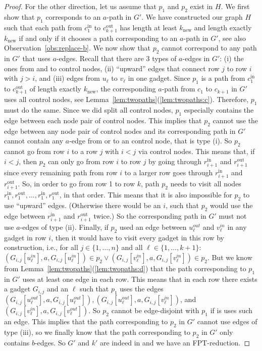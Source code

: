 \documentclass[a4paper,english]{lipics-v2016}
\theoremstyle{plain}
\begin{document}
\begin{proof}
For the other direction, let us assume that $p_1$ and $p_2$ exist in $H$.
We first show that $p_1$ corresponds to an $a$-path in $G'$. 
We have constructed our graph $H$ such that each path from $c_{1}^\text{in}$ to $c_{k+1}^\text{out}$ has length at least $k_\text{new}$ and length exactly $k_\text{new}$ if and only if it chooses a path corresponding to an $a$-path in $G'$, see also Observation~\ref{obs:replace-b}. 
We now show that $p_2$ cannot correspond to any path in $G'$ that uses $a$-edges.
Recall that there are 3 types of $a$-edges in $G'$: (i) the ones from and to control nodes, (ii) ``upward'' edges that connect row $j$ to row $i$ with $j > i$, and (iii) edges from $u_\ell$ to $v_\ell$ in one gadget.
Since $p_1$ is a path from $c_{1}^\text{in}$ to $c_{k+1}^\text{out}$ of length exactly $k_\text{new}$, the corresponding $a$-path from $c_1$ to $c_{k+1}$ in $G'$ uses all control nodes, see Lemma~\ref{lem:twopaths}(\ref{lem:twopaths:c}). Therefore, $p_1$ must do the same. Since we did split all control nodes, $p_1$ especially contains the edge between each node pair of control nodes. This implies that $p_2$ cannot use the edge between any node pair of control nodes and its corresponding path in $G'$ cannot contain any $a$-edge from or to an control node, that is type (i). 
So $p_2$ cannot go from row $i$ to a row $j$ with $i<j$ via control nodes. This means that, if $i < j$, then $p_2$ can only go from row $i$ to row $j$ by going through $r_{i+1}^\text{in}$ and $r_{i+1}^\text{out}$ since every remaining path from row $i$ to a larger row goes through $r_{i+1}^\text{in}$ and $r_{i+1}^\text{out}$. So, in order to go from row 1 to row $k$, path $p_2$ needs to visit all nodes $r_{1}^\text{in},r_{1}^\text{out}, \ldots, r_{1}^\text{in},r_{1}^\text{out}$, in that order. This means that it is also impossible for $p_2$ to use ``upward'' edges. (Otherwise there would be an $i$, such that $p_2$ would use the edge between $r_{i+1}^\text{in}$ and $r_{i+1}^\text{out}$ twice.) So the corresponding path in $G'$ must not use $a$-edges of type (ii). 
Finally, if $p_2$ used an edge between $u_\ell^{out}$ and $v_\ell^{in}$ in any gadget in row $i$, then it would have to visit every gadget in this row by construction, i.e., for all $j \in \{1,\ldots,n\}$ and all $\ell \in \{1,\ldots,k+1\}$: $(G_{i,j}[u_\ell^{in}],a,G_{i,j}[u_\ell^{in}]) \in p_2 \lor (G_{i,j}[v_\ell^{in}],a,G_{i,j}[v_\ell^{in}]) \in p_2$. 
But we know from Lemma~\ref{lem:twopaths}(\ref{lem:twopaths:d}) that the path corresponding to $p_1$ in $G'$ uses at least one edge in each row. This means that in each row there exists a gadget $G_{i,j}$ and an $\ell$ such that $p_1$ uses the edges $(G_{i,j}[u_\ell^{out}],a,G_{i,j}[u_\ell^{out}]), (G_{i,j}[u_\ell^{out}],a,G_{i,j}[v_\ell^{in}])$, and $(G_{i,j}[v_\ell^{in}],a,G_{i,j}[v_\ell^{out}])$. So $p_2$ cannot be edge-disjoint with $p_1$ if is uses such an edge. This implies that the path corresponding to $p_2$ in $G'$ cannot use edges of type (iii), so we finally know that the path corresponding to $p_2$ in $G'$ only contains $b$-edges.
So $G'$ and $k'$ are indeed in \knodecolordisjointpaths and we have an FPT-reduction.
\end{proof}
\end{document}
